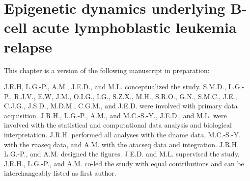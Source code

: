 \chapter{Epigenetic dynamics underlying B-cell acute lymphoblastic leukemia relapse}
\label{chap:BALL}

This chapter is a version of the following manuscript in preparation:


J.R.H, L.G.-P., A.M., J.E.D., and M.L. conceptualized the study.
S.M.D., L.G.-P., R.J.V., E.W, J.M., O.I.G., I.G., S.Z.X., M.H., S.R.O., G.N., S.M.C., J.E., C.J.G., J.S.D., M.D.M., C.G.M., and J.E.D. were involved with primary data acquisition.
J.R.H., L.G.-P., A.M., and M.C.-S.-Y., J.E.D., and M.L. were involved with the statistical and computational data analysis and biological interpretation.
J.R.H. performed all analyses with the \gls{dname} data, M.C.-S.-Y. with the \gls{rnaseq} data, and A.M. with the \gls{atacseq} data and integration.
J.R.H, L.G.-P., and A.M. designed the figures.
J.E.D. and M.L. supervised the study.
J.R.H., L.G.-P., and A.M. co-led the study with equal contributions and can be interchangeably listed as first author.






